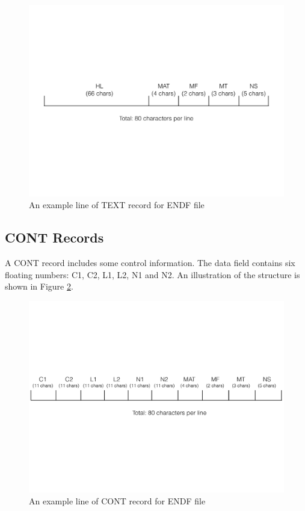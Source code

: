 \begin{figure}[h]
\begin{center}
\includegraphics[scale=0.4]{./pics/endf-6-record-text.pdf}
\end{center}
\caption{ \label{fig:endf-6-record-text}
An example line of TEXT record for ENDF file}
\end{figure}

\subsection{CONT Records}
A CONT record includes some control information. The data field contains six floating numbers: C1, C2, L1, L2, N1 and N2. An illustration of the structure is shown in Figure \ref{fig:endf-6-record-cont}.

\begin{figure}[h]
\begin{center}
\includegraphics[scale=0.4]{./pics/endf-6-record-cont.pdf}
\end{center}
\caption{ \label{fig:endf-6-record-cont}
An example line of CONT record for ENDF file}
\end{figure}

